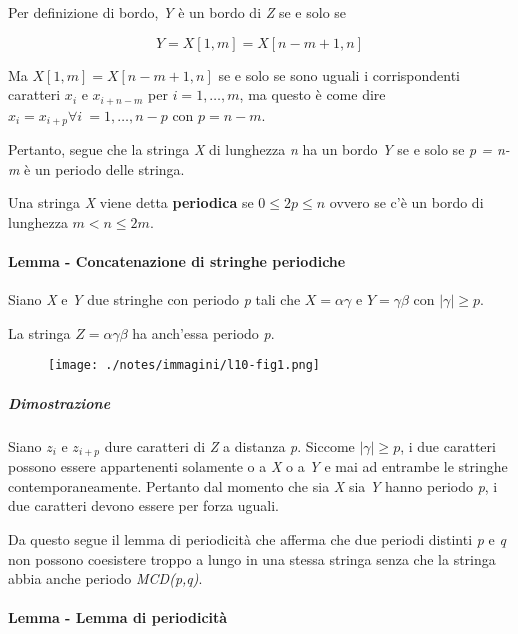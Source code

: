 Per definizione di bordo, \emph{Y} è un bordo di \emph{Z} se e solo se

$$
Y = X[1,m]=X[n-m+1,n]
$$

Ma $X[1,m] = X[n-m+1,n]$ se e solo se sono uguali i corrispondenti caratteri $x_i$ e $x_{i+n-m}$ per $i = 1, \ldots, m$, ma questo è come dire $x_i = x_{i+p} \forall i \: = 1,\ldots, n-p $ con $p  = n-m$. 

Pertanto, segue che la stringa \textit{X} di lunghezza \textit{n} ha un bordo \textit{Y} se e solo se \textit{p = n-m} è un periodo delle stringa.

Una stringa \emph{X} viene detta \textbf{periodica} se
$0 \leq 2p \leq n$ ovvero se c'è un bordo di lunghezza
$m  < n \leq 2m$.

\paragraph{Lemma - Concatenazione di stringhe periodiche}\label{lemma---concatenazione-di-stringhe-periodiche}

Siano \emph{X} e \emph{Y} due stringhe con periodo \emph{p} tali che $X = \alpha\gamma$ e $Y = \gamma\beta$ con $|\gamma| \geq p$.

La stringa $Z = \alpha\gamma\beta$ ha anch'essa periodo \emph{p}.

\begin{figure}[htbp]
\centering
\texttt{[image: ./notes/immagini/l10-fig1.png]}
\end{figure}

\subparagraph{Dimostrazione}\label{dimostrazione-1}

Siano $ z_i $ e $ z_{i+p} $ dure caratteri di \textit{Z} a distanza \textit{p}. Siccome $ |\gamma|  \geq p$, i due caratteri possono essere appartenenti solamente o a \textit{X} o a \textit{Y} e mai ad entrambe le stringhe contemporaneamente. 
Pertanto dal momento che sia \textit{X} sia \textit{Y} hanno periodo \textit{p}, i due caratteri devono essere per forza uguali.

Da questo segue il lemma di periodicità che afferma che due periodi distinti \emph{p} e \emph{q} non possono coesistere troppo a lungo in
una stessa stringa senza che la stringa abbia anche periodo \emph{MCD(p,q)}.

\paragraph{Lemma - Lemma di periodicità}\label{lemma---lemma-di-periodicituxe0}

